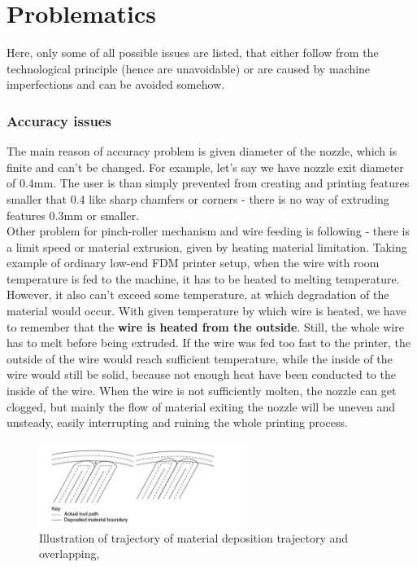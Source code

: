 \documentclass[a4paper, twoside, 11pt]{report}
\begin{document}
\section{Problematics}
Here, only some of all possible issues are listed, that either follow from the technological principle (hence are unavoidable) or are caused by machine imperfections and can be avoided somehow.
\subsubsection{Accuracy issues}
The main reason of accuracy problem is given diameter of the nozzle, which is finite and can't be changed. For example, let's say we have nozzle exit diameter of 0.4mm. The user is than simply prevented from creating and printing features smaller that 0.4 like sharp chamfers or corners - there is no way of extruding features 0.3mm or smaller.\\
	Other problem for pinch-roller mechanism and wire feeding is following - there is a limit speed or material extrusion, given by heating material limitation. Taking example of ordinary low-end FDM printer setup, when the wire with room temperature is fed to the machine, it has to be heated to melting temperature. However, it  also can't exceed some temperature, at which degradation of the material would occur. With given temperature by which wire is heated, we have to remember that the \textbf{wire is heated from the outside}. Still, the whole wire has to melt before being extruded. If the wire was fed too fast to the printer, the outside of the wire would reach sufficient temperature, while the inside of the wire would still be solid, because not enough heat have been conducted to the inside of the wire. When the wire is not sufficiently molten, the nozzle can get clogged, but mainly the flow of material exiting the nozzle will be uneven and unsteady, easily interrupting and ruining the whole printing process.\\
\begin{figure}
 	\includegraphics[width=0.6\textwidth]{depositionIllustration}
	\caption{Illustration of trajectory of material deposition trajectory and overlapping, \cite[p. 159]{AMT}}
\end{figure}
\end{document}
